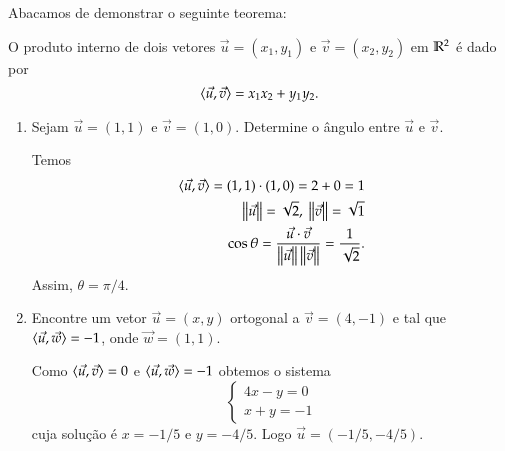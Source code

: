 Abacamos de demonstrar o seguinte teorema:
\begin{teorema}
  O produto interno de dois vetores $\vec{u} = (x_1, y_1)$ e $\vec{v} = (x_2, y_2)$ em $\mathbb{R}^2$ \'e dado por
  \[
    \langle \vec{u}, \vec{v} \rangle = x_1x_2 + y_1y_2.
  \]
\end{teorema}

\begin{exemplos}
  \begin{enumerate}
    \item Sejam $\vec{u} = (1, 1)$ e $\vec{v} = (1,0)$. Determine o \^angulo entre $\vec{u}$ e $\vec{v}$.
    \begin{solucao}
      Temos
      \begin{align*}
        \langle \vec{u}, \vec{v} \rangle = (1, 1)\cdot(1,0) = 2 + 0 = 1\\
        \left\Vert{\vec{u}}\right\Vert = \sqrt{2},\ \left\Vert{\vec{v}}\right\Vert = \sqrt{1}\\
        \cos\theta = \frac{\vec{u}\cdot\vec{v}}{\left\Vert{\vec{u}}\right\Vert\left\Vert{\vec{v}}\right\Vert} = \dfrac{1}{\sqrt{2}}.
      \end{align*}
      Assim, $\theta = \pi/4$.
    \end{solucao}
    \item Encontre um vetor $\vec{u} = (x, y)$ ortogonal a $\vec{v} = (4, -1)$ e tal que $\langle \vec{u}, \vec{w} \rangle = -1$, onde $\vec{w} = (1,1)$.
    \begin{solucao}
      Como $\langle \vec{u}, \vec{v} \rangle = 0$ e $\langle \vec{u}, \vec{w} \rangle = -1$ obtemos o sistema
      \[
        \begin{cases}
          4x - y = 0\\
          x + y = -1
        \end{cases}
      \]
      cuja solu\c{c}\~ao \'e $x = -1/5$ e $y = -4/5$. Logo $\vec{u} = (-1/5, -4/5)$.
    \end{solucao}
  \end{enumerate}
\end{exemplos}

